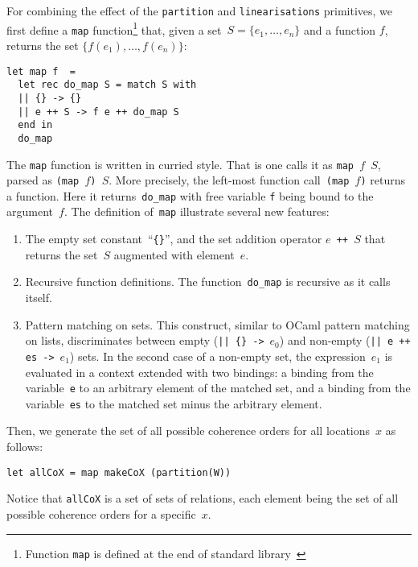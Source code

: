 For combining the effect of the \texttt{partition} and \texttt{linearisations}
primitives, we first define a \texttt{map}
function\footnote{Function \texttt{map} is defined at the end of \herd standard
library~} that, given a set~$S=
\{e_1,\ldots,e_n\}$ and a function $f$, returns the set
$\{f(e_1),\ldots,f(e_n)\}$:
\begin{verbatim}
let map f  =
  let rec do_map S = match S with
  || {} -> {}
  || e ++ S -> f e ++ do_map S
  end in
  do_map
\end{verbatim}
The \texttt{map} function is written in curried style.
That is one calls it as \texttt{map~$f$~$S$}, parsed
as \texttt{(map~$f$)~$S$}. More precisely, the left-most function
call~\texttt{(map~$f$)} returns a function.
Here it returns~\texttt{do\_map} with free variable \texttt{f} being bound
to the argument~$f$.
The definition of~\texttt{map} illustrate several new features:
\begin{enumerate}
\item The empty set constant~``\verb+{}+'',
and the set addition operator \texttt{$e$ ++ $S$} that returns the set~$S$
augmented with element~$e$.
\item Recursive function definitions. The function~\verb+do_map+
is recursive as it calls itself.
\item Pattern matching on sets.
This construct, similar to OCaml pattern matching on lists, discriminates
between empty (\verb+|| {} ->+~$e_0$) and non-empty
(\verb!|| e ++ es ->!~$e_1$) sets.
In the second case of a non-empty set, the expression~$e_1$ is evaluated
in a context extended with two bindings: a binding from the variable~\texttt{e}
to an arbitrary element of the matched set, and a binding from
the variable~\texttt{es} to the matched set minus the arbitrary element.
\end{enumerate}

Then, we generate the set of all possible coherence orders
for all locations~$x$ as follows:
\begin{verbatim}
let allCoX = map makeCoX (partition(W))
\end{verbatim}
Notice that \texttt{allCoX} is a set of sets of relations,
each element being the set of all possible coherence orders
for a specific~$x$.

